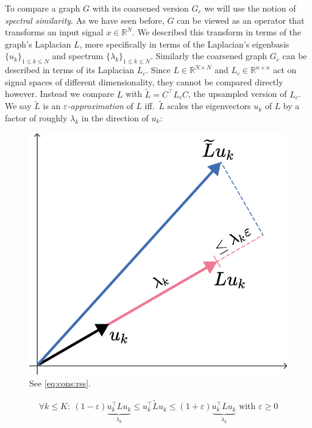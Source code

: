 To compare a graph $G$ with its coarsened version $G_c$ we will use the notion of \textit{spectral similarity}.
As we have seen before, $G$ can be viewed as an operator that transforms an input signal $x \in \mathbb{R}^N$.
We described this transform in terms of the graph's Laplacian $L$,
more specifically in terms of the Laplacian's eigenbasis ${\{ u_k \}}_{1 \leq k \leq N}$ and spectrum ${\{ \lambda_k \}}_{1 \leq k \leq N}$.
Similarly the coarsened graph $G_c$ can be described in terms of its Laplacian $L_c$.
Since $L \in \mathbb{R}^{N \times N}$ and $L_c \in \mathbb{R}^{n \times n}$ act on signal spaces of different dimensionality, they cannot be compared directly however.
Instead we compare $L$ with $\widetilde{L} = C^{\top} L_c C$, the upsampled version of $L_c$.
We say $\widetilde{L}$ is an \textit{$\varepsilon$-approximation} of $L$ iff.\  $\widetilde{L}$ scales the eigenvectors $u_k$ of $L$ by a factor of roughly $\lambda_k$ in the direction of $u_k$:
\begin{figure}
	\centering
	\includegraphics[width=\linewidth]{gfx/cons/rss.pdf}
	\caption{See \cref{eq:cons:rss}.}\label{fig:cons:rss}
\end{figure}
\begin{align}
	\forall k \leq K:\ (1 - \varepsilon) \underbrace{u_k^{\top} L u_k}_{\lambda_k} \leq u_k^{\top} \widetilde{L} u_k \leq (1 + \varepsilon) \underbrace{u_k^{\top} L u_k}_{\lambda_k} \text{ with } \varepsilon \geq 0\label{eq:cons:rss}
\end{align}
